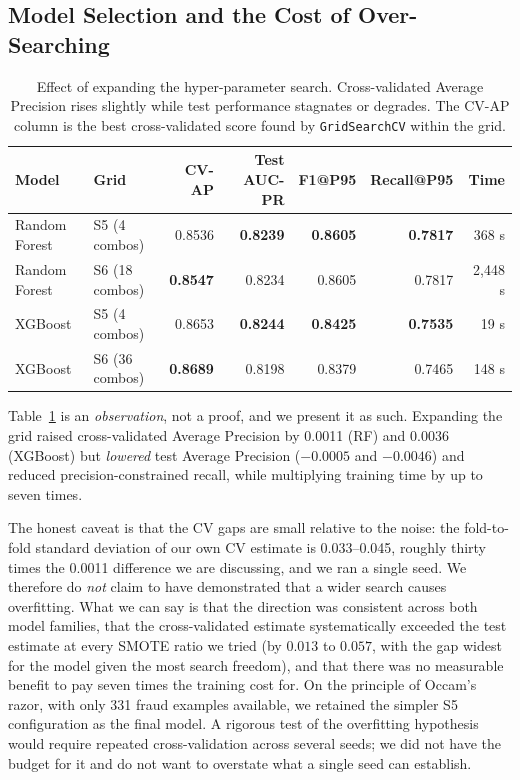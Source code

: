 \subsection{Model Selection and the Cost of Over-Searching}
\label{sec:search}

\begin{table}[h!]
\centering
\caption{Effect of expanding the hyper-parameter search. Cross-validated
Average Precision rises slightly while test performance stagnates or degrades.
The CV-AP column is the best cross-validated score found by
\texttt{GridSearchCV} within the grid.}
\label{tab:refine}
\begin{tabular}{p{2.9cm}p{2.6cm}rrrrr}
\toprule
\textbf{Model} & \textbf{Grid} & \textbf{CV-AP} & \textbf{Test AUC-PR} & \textbf{F1@P95} & \textbf{Recall@P95} & \textbf{Time} \\
\midrule
Random Forest & S5 (4 combos) & 0.8536 & \textbf{0.8239} & \textbf{0.8605} & \textbf{0.7817} & 368 s \\
Random Forest & S6 (18 combos) & \textbf{0.8547} & 0.8234 & 0.8605 & 0.7817 & 2{,}448 s \\
XGBoost & S5 (4 combos) & 0.8653 & \textbf{0.8244} & \textbf{0.8425} & \textbf{0.7535} & 19 s \\
XGBoost & S6 (36 combos) & \textbf{0.8689} & 0.8198 & 0.8379 & 0.7465 & 148 s \\
\bottomrule
\end{tabular}
\end{table}

Table~\ref{tab:refine} is an \emph{observation}, not a proof, and we
present it as such. Expanding the grid raised cross-validated Average
Precision by 0.0011 (RF) and 0.0036 (XGBoost) but \emph{lowered} test Average
Precision ($-0.0005$ and $-0.0046$) and reduced precision-constrained recall,
while multiplying training time by up to seven times.

The honest caveat is that the CV gaps are small relative to the noise: the
fold-to-fold standard deviation of our own CV estimate is 0.033--0.045, roughly
thirty times the 0.0011 difference we are discussing, and we ran a single seed.
We therefore do \emph{not} claim to have demonstrated that a wider search
causes overfitting. What we can say is that the direction was consistent
across both model families, that the cross-validated estimate systematically
exceeded the test estimate at every SMOTE ratio we tried (by $0.013$ to
$0.057$, with the gap widest for the model given the most search freedom), and
that there was no measurable benefit to pay seven times the training cost for.
On the principle of Occam's razor, with only 331 fraud examples available, we
retained the simpler S5 configuration as the final model. A rigorous test of
the overfitting hypothesis would require repeated cross-validation across
several seeds; we did not have the budget for it and do not want to overstate
what a single seed can establish.

